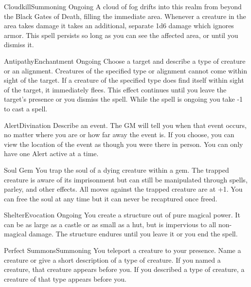 \documentclass[8pt]{extarticle}
\begin{document}
\begin{multicols}{2}
  \begin{aspell}{Cloudkill}{Summoning Ongoing}
    A cloud of fog drifts into this realm from beyond the Black Gates
    of Death, filling the immediate area. Whenever a creature in the
    area takes damage it takes an additional, separate 1d6 damage
    which ignores armor. This spell persists so long as you can see
    the affected area, or until you dismiss it.
  \end{aspell}

\vfill\null
\end{multicols}

\begin{multicols}{2}

  \begin{aspell}{Antipathy}{Enchantment Ongoing}
    Choose a target and describe a type of creature or an
    alignment. Creatures of the specified type or alignment cannot
    come within sight of the target. If a creature of the specified
    type does find itself within sight of the target, it immediately
    flees. This effect continues until you leave the target’s presence
    or you dismiss the spell. While the spell is ongoing you take -1
    to cast a spell.
  \end{aspell}

  \begin{aspell}{Alert}{Divination}
    Describe an event. The GM will tell you when that event occurs, no
    matter where you are or how far away the event is. If you choose,
    you can view the location of the event as though you were there in
    person. You can only have one Alert active at a time.
  \end{aspell}

  \vfill\null
  \columnbreak

  \begin{aspell}{Soul Gem}{}
    You trap the soul of a dying creature within a gem. The trapped
    creature is aware of its imprisonment but can still be manipulated
    through spells, parley, and other effects. All moves against the
    trapped creature are at +1. You can free the soul at any time but
    it can never be recaptured once freed.
  \end{aspell}

  \begin{aspell}{Shelter}{Evocation Ongoing}
    You create a structure out of pure magical power. It can be as
    large as a castle or as small as a hut, but is impervious to all
    non-magical damage. The structure endures until you leave it or
    you end the spell.
  \end{aspell}

  \begin{aspell}{Perfect Summons}{Summoning}
    You teleport a creature to your presence. Name a creature or give
    a short description of a type of creature. If you named a
    creature, that creature appears before you. If you described a
    type of creature, a creature of that type appears before you.
  \end{aspell}

\vfill\null
\end{multicols}
\end{document}
